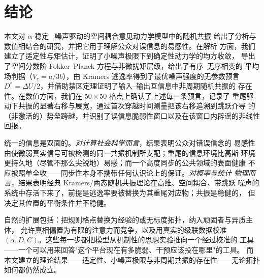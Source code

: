 \section{结论}
\label{sec:conclusion}
本文对 $\alpha$-稳定 \Levy\ 噪声驱动的空间耦合意见动力学模型中的随机共振
给出了分析与数值相结合的研究，并把它用于理解公众对误信息的易感性。在解析
方面，我们建立了适定性与矩估计，证明了小噪声极限下到确定性动力学的均方收敛，
导出了空间分数阶 Fokker--Planck 方程与非微扰矩层级，给出了有序--无序相变的
平均场判据（$V_c=a/3b$），由 Kramers 逃逸率得到了最优噪声强度的无参数预言
$D^{*}=\Delta U/2$，并借助禁区定理证明了输入--输出互信息中非周期随机共振的
存在性。在数值方面，我们在 $50\times50$ 格点上确认了上述每一条预言，记录了
重尾驱动下共振的显著右移与展宽，通过首次穿越时间测量把该右移追溯到跳跃介导
的（非激活的）势垒跨越，并识别了误信息脆弱性窗口以及在该窗口内辟谣的非线性
回报。

统一的信息是双面的。\emph{对计算社会科学而言}，结果表明公众对错误信念的
易感性由使微弱真实信号可被检测的同一共振机制所支配；重尾的信息环境比高斯
环境更持久地（尽管不那么尖锐地）易感；而一个高度同步的公共领域的表面健康
不应被照单全收——同步性本身不携带任何认识论上的保证。\emph{对概率与统计
物理而言}，结果表明经典 Kramers/两态随机共振理论在高维、空间耦合、带跳跃
噪声的系统中存活下来了，前提是逃逸率要被替换为其重尾对应物；共振是稳健的，
但决定其位置的平衡条件并不稳健。

自然的扩展包括：把规则格点替换为经验的或无标度拓扑，纳入顽固者与异质主体，
允许真相偏置为有限的注意力而竞争，以及用真实的级联数据校准
$(\alpha,D,C)$。这些每一步都把模型从机制性的思想实验推向一个经过校准的
工具——一个可以用来回答"这个平台现在有多脆弱、干预应该投在哪里"的工具。
而本文建立的理论结果——适定性、小噪声极限与非周期共振的存在性——无论拓扑
如何都仍然成立。
